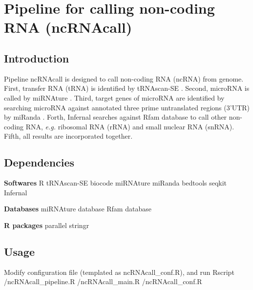 \documentclass[11pt]{article}
\begin{document}
\begin{sloppypar}
\section{Pipeline for calling non-coding RNA (ncRNAcall)}
\subsection{Introduction}
Pipeline ncRNAcall is designed to call non-coding RNA (ncRNA) from genome. 
First, transfer RNA (tRNA) is identified by tRNAscan-SE \parencite{lowe1997trnascan}. 
Second, microRNA is called by miRNAture \parencite{velandia2021mirnature}. 
Third, target genes of microRNA are identified by searching microRNA against annotated three prime untranslated regions (3'UTR) by miRanda \parencite{enright2003microrna}. 
Forth, Infernal \parencite{nawrocki2013infernal} searches against Rfam \parencite{kalvari2021rfam} database to call other non-coding RNA, \textit{e.g.} ribosomal RNA (rRNA) and small nuclear RNA (snRNA). 
Fifth, all results are incorporated together. 
\subsection{Dependencies}
\textbf{Softwares} \newline
R \newline
tRNAscan-SE \newline
biocode \newline
miRNAture \newline
miRanda \newline
bedtools \newline
seqkit \newline
Infernal \newline
\par
\textbf{Databases} \newline
miRNAture database \newline
Rfam database \newline
\par
\textbf{R packages}
parallel \newline
stringr \newline
\par
\subsection{Usage}
Modify configuration file (templated as ncRNAcall\_conf.R), and run \newline
Rscript /ncRNAcall\_pipeline.R /ncRNAcall\_main.R /ncRNAcall\_conf.R

\printbibliography
\end{sloppypar}
\end{document}
